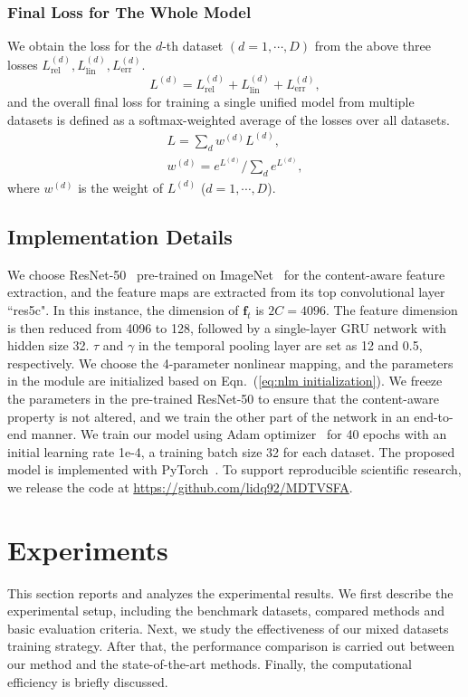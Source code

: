 \documentclass[twocolumn]{svjour3}          \smartqed  \usepackage{graphicx}
\begin{document}
\subsubsection{Final Loss for The Whole Model}
We obtain the loss for the $d$-th dataset $(d=1,\cdots,D)$ from the above three losses $L^{(d)}_{\mathrm{rel}}, L^{(d)}_{\mathrm{lin}}, L^{(d)}_{\mathrm{err}}$.
\begin{equation}\label{eq:loss on d}
L^{(d)} = L^{(d)}_{\mathrm{rel}} + L^{(d)}_{\mathrm{lin}} + L^{(d)}_{\mathrm{err}}, 
\end{equation}
and the overall final loss for training a single unified model from multiple datasets is defined as a softmax-weighted average of the losses over all datasets.
\begin{equation}\label{eq:overall loss}
\begin{array}{l}
L= \sum_{d} w^{(d)}L^{(d)}, \\[2mm]
w^{(d)}=  e^{L^{(d)}}/\sum_{d} e^{L^{(d)}},
\end{array}
\end{equation}
where $w^{(d)}$ is the weight of $L^{(d)}$ ($d=1,\cdots,D$).

\subsection{Implementation Details}
We choose ResNet-50~\citep{he2016deep} pre-trained on ImageNet~\citep{deng2009imagenet} for the content-aware feature extraction, and the feature maps are extracted from its top convolutional layer ``res5c". 
In this instance, the dimension of $\mathbf{f}_t$ is $2C=4096$.
The feature dimension is then reduced from 4096 to 128, followed by a single-layer GRU network with hidden size 32. 
$\tau$ and $\gamma$ in the temporal pooling layer are set as 12 and 0.5, respectively. 
We choose the 4-parameter nonlinear mapping, and the parameters in the module are initialized based on Eqn.~(\ref{eq:nlm initialization}).
We freeze the parameters in the pre-trained ResNet-50 to ensure that the content-aware property is not altered, and we train the other part of the network in an end-to-end manner. 
We train our model using Adam optimizer~\citep{kingma2014adam} for 40 epochs with an initial learning rate 1e-4, a training batch size 32 for each dataset.
The proposed model is implemented with PyTorch~\citep{paszke2019pytorch}.
To support reproducible scientific research, we release the code at \url{https://github.com/lidq92/MDTVSFA}.

\section{Experiments}
\label{sec:experiments}
This section reports and analyzes the experimental results. 
We first describe the experimental setup, including the benchmark datasets, compared methods and basic evaluation criteria. 
Next, we study the effectiveness of our mixed datasets training strategy. 
After that, the performance comparison is carried out between our method and the state-of-the-art methods. 
Finally, the computational efficiency is briefly discussed.
\end{document}
